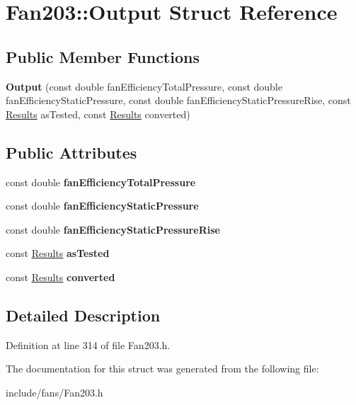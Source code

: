 \hypertarget{struct_fan203_1_1_output}{}\section{Fan203\+:\+:Output Struct Reference}
\label{struct_fan203_1_1_output}
\subsection*{Public Member Functions}
\begin{DoxyCompactItemize}
\item 
\mbox{\label{struct_fan203_1_1_output_abe97e6fa71bba10b78bb6446390ef57e}} 
{\bfseries Output} (const double fan\+Efficiency\+Total\+Pressure, const double fan\+Efficiency\+Static\+Pressure, const double fan\+Efficiency\+Static\+Pressure\+Rise, const \hyperlink{struct_fan203_1_1_results}{Results} as\+Tested, const \hyperlink{struct_fan203_1_1_results}{Results} converted)
\end{DoxyCompactItemize}
\subsection*{Public Attributes}
\begin{DoxyCompactItemize}
\item 
\mbox{\label{struct_fan203_1_1_output_a1c693f72537a3b09c5675e9597582b99}} 
const double {\bfseries fan\+Efficiency\+Total\+Pressure}
\item 
\mbox{\label{struct_fan203_1_1_output_a3ed8a45f96d2c0d59f5c4780dfa706f5}} 
const double {\bfseries fan\+Efficiency\+Static\+Pressure}
\item 
\mbox{\label{struct_fan203_1_1_output_a65e4c8f90e87720f09f5691a75ef34b8}} 
const double {\bfseries fan\+Efficiency\+Static\+Pressure\+Rise}
\item 
\mbox{\label{struct_fan203_1_1_output_a82901834cabb87e119d0b1186a06aeae}} 
const \hyperlink{struct_fan203_1_1_results}{Results} {\bfseries as\+Tested}
\item 
\mbox{\label{struct_fan203_1_1_output_a775ac959a1b54c2cdb2eb695fcb3ace3}} 
const \hyperlink{struct_fan203_1_1_results}{Results} {\bfseries converted}
\end{DoxyCompactItemize}


\subsection{Detailed Description}


Definition at line 314 of file Fan203.\+h.



The documentation for this struct was generated from the following file\+:\begin{DoxyCompactItemize}
\item 
include/fans/Fan203.\+h\end{DoxyCompactItemize}

